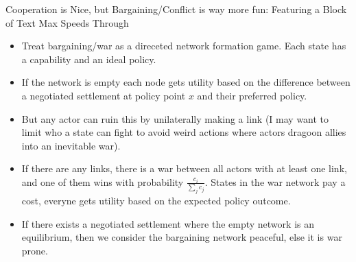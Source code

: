 \documentclass{beamer}
\begin{document}
\begin{frame}{Cooperation is Nice, but Bargaining/Conflict is way more fun: Featuring a Block of Text Max Speeds Through}
\begin{itemize}
\item Treat bargaining/war as a direceted network formation game. Each state has a capability and an ideal policy.
\item If the network is empty each node gets utility based on the difference between a negotiated settlement at policy point $x$ and their preferred policy.
\item But any actor can ruin this by unilaterally making a link (I may want to limit who a state can fight to avoid weird actions where actors dragoon allies into an inevitable war).
\item If there are any links, there is a war between all actors with at least one link, and one of them wins with probability $\frac{c_{i}}{\sum_{j} c_{j}}$. States in the war network pay a cost, everyne gets utility based on the expected policy outcome.
\item If there exists a negotiated settlement where the empty network is an equilibrium, then we consider the bargaining network peaceful, else it is war prone.
\end{itemize}
\end{frame}
\end{document}
